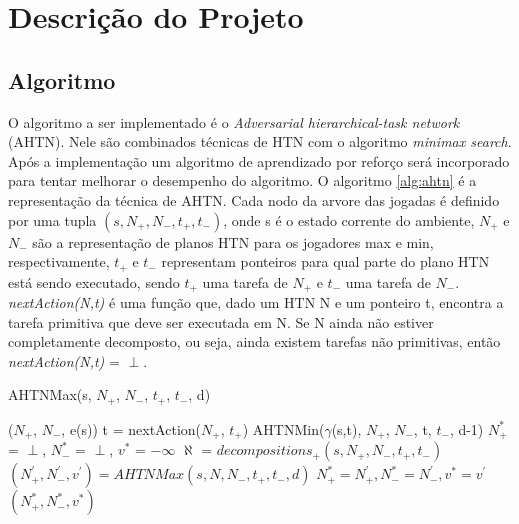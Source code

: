 \chapter{\label{chap:descr}Descrição do Projeto}

\section{Algoritmo}
O algoritmo a ser implementado é o \textit{Adversarial hierarchical-task network} (AHTN). Nele são combinados técnicas de HTN com o algoritmo \textit{minimax search}. Após a implementação um algoritmo de aprendizado por reforço será incorporado para tentar melhorar o desempenho do algoritmo. O algoritmo \ref{alg:ahtn} é a representação da técnica de AHTN. Cada nodo da arvore das jogadas é definido por uma tupla $(s, N_{+}, N_{-}, t_{+}, t_{-})$, onde s é o estado corrente do ambiente, $N_{+}$ e $N_{-}$ são a representação de planos HTN para os jogadores max e min, respectivamente, $t_{+}$ e $t_{-}$ representam ponteiros para qual parte do plano HTN está sendo executado, sendo  $t_{+}$ uma tarefa de $N_{+}$ e $t_{-}$ uma tarefa de $N_{-}$. \textit{nextAction(N,t)} é uma função que, dado um HTN N e um ponteiro t, encontra a tarefa primitiva que deve ser executada em N. Se N ainda não estiver completamente decomposto, ou seja, ainda existem tarefas não primitivas, então \textit{nextAction(N,t)} = $\perp$.    %

\begin{algorithm}
	\caption{AHTNMax(s, $N_{+}$, $N_{-}$, $t_{+}$, $t_{-}$, d)}
	\label{alg:ahtn}
	\begin{algorithmic}[1]
		\State	\Return ($N_{+}$, $N_{-}$, e(s))
		\EndIf
		\State t = nextAction($N_{+}$, $t_{+}$) 
		\State \Return AHTNMin($\gamma$(s,t), $N_{+}$, $N_{-}$, t, $t_{-}$, d-1)
		\EndIf
		\State $N_{+}^{*}$ = $\perp$, $N_{-}^{*}$ = $\perp$, $v^{*}$ = $-\infty$
		\State $\aleph$ = $decompositions_{+}(s, N_{+}, N_{-}, t_{+}, t_{-})$
		\State $(N^{'}_{+}, N^{'}_{-}, v^{'}) = AHTNMax(s, N, N_{-}, t_{+}, t_{-}, d)$
		\State $N_{+}^{*} = N^{'}_{+}, N_{-}^{*} = N^{'}_{-}, v^{*} = v^{'} $
		\EndIf
		\EndFor		
		\State \Return $(N_{+}^{*}, N_{-}^{*}, v^{*} )$
	\end{algorithmic}
\end{algorithm}


